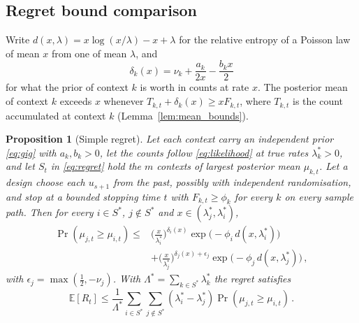 \documentclass[twoside]{article}
\theoremstyle{plain}
\newtheorem{proposition}{Proposition}
\theoremstyle{definition}
\theoremstyle{remark}
\begin{document}
\subsection{Regret bound comparison}
\label{sec:properties_regret}

Write $d(x, \lambda) = x \log(x / \lambda) - x + \lambda$ for the relative entropy of a Poisson law of mean $x$ from one of mean $\lambda$, and
%
\begin{equation}
    \delta_k(x) = \nu_k + \frac{a_k}{2x} - \frac{b_k x}{2}
    \label{eq:prior_counts}
\end{equation}
%
for what the prior of context $k$ is worth in counts at rate $x$.
The posterior mean of context $k$ exceeds $x$ whenever $T_{k,t} + \delta_k(x) \geq x F_{k,t}$, where $T_{k,t}$ is the count accumulated at context $k$ (Lemma~\ref{lem:mean_bounds}).

\begin{proposition}[Simple regret]
    \label{prop:regret}
    Let each context carry an independent prior \eqref{eq:gig} with $a_k, b_k > 0$, let the counts follow \eqref{eq:likelihood} at true rates $\lambda^{*}_k > 0$, and let $S_t$ in \eqref{eq:regret} hold the $m$ contexts of largest posterior mean $\mu_{k,t}$.
    Let a design choose each $u_{s+1}$ from the past, possibly with independent randomisation, and stop at a bounded stopping time $t$ with $F_{k,t} \geq \phi_k$ for every $k$ on every sample path.
    Then for every $i \in S^{*}$, $j \notin S^{*}$ and $x \in (\lambda^{*}_j, \lambda^{*}_i)$,
    \begin{equation}
        \begin{split}
            \Pr(\mu_{j,t} \geq \mu_{i,t}) \leq{} & \Big( \frac{x}{\lambda^{*}_i} \Big)^{\delta_i(x)} \exp\big( -\phi_i \, d(x, \lambda^{*}_i) \big) \\
            & + \Big( \frac{x}{\lambda^{*}_j} \Big)^{\delta_j(x) + \epsilon_j} \exp\big( -\phi_j \, d(x, \lambda^{*}_j) \big) \,,
        \end{split}
        \label{eq:misranking}
    \end{equation}
    with $\epsilon_j = \max(\tfrac{1}{2}, -\nu_j)$.
    With $\Lambda^{*} = \sum_{k \in S^{*}} \lambda^{*}_k$ the regret satisfies
    \begin{equation}
        \mathbb{E}[R_t] \leq \frac{1}{\Lambda^{*}} \sum_{i \in S^{*}} \sum_{j \notin S^{*}} (\lambda^{*}_i - \lambda^{*}_j) \Pr(\mu_{j,t} \geq \mu_{i,t}) \,.
        \label{eq:regret_bound}
    \end{equation}
\end{proposition}
\end{document}

